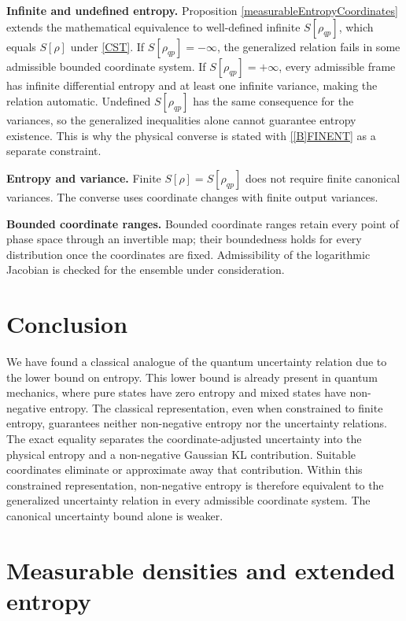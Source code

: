 \documentclass{techbrief}
\begin{document}
\textbf{Infinite and undefined entropy.} Proposition \ref{measurableEntropyCoordinates} extends the mathematical equivalence to well-defined infinite $S[\rho_{qp}]$, which equals $S[\rho]$ under \ref{CST}. If $S[\rho_{qp}]=-\infty$, the generalized relation fails in some admissible bounded coordinate system. If $S[\rho_{qp}]=+\infty$, every admissible frame has infinite differential entropy and at least one infinite variance, making the relation automatic. Undefined $S[\rho_{qp}]$ has the same consequence for the variances, so the generalized inequalities alone cannot guarantee entropy existence. This is why the physical converse is stated with \ref{[B]FINENT} as a separate constraint.

\textbf{Entropy and variance.} Finite $S[\rho]=S[\rho_{qp}]$ does not require finite canonical variances. The converse uses coordinate changes with finite output variances.

\textbf{Bounded coordinate ranges.} Bounded coordinate ranges retain every point of phase space through an invertible map; their boundedness holds for every distribution once the coordinates are fixed. Admissibility of the logarithmic Jacobian is checked for the ensemble under consideration.

\section{Conclusion}

We have found a classical analogue of the quantum uncertainty relation due to the lower bound on entropy. This lower bound is already present in quantum mechanics, where pure states have zero entropy and mixed states have non-negative entropy. The classical representation, even when constrained to finite entropy, guarantees neither non-negative entropy nor the uncertainty relations. The exact equality separates the coordinate-adjusted uncertainty into the physical entropy and a non-negative Gaussian KL contribution. Suitable coordinates eliminate or approximate away that contribution. Within this constrained representation, non-negative entropy is therefore equivalent to the generalized uncertainty relation in every admissible coordinate system. The canonical uncertainty bound alone is weaker.

\iffalse


\appendix
\section{Measurable densities and extended entropy}\label{measurableAppendix}
\end{document}
